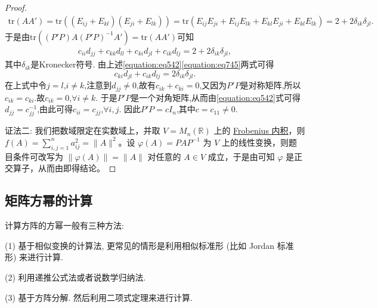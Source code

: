 \documentclass[../../main.tex]{subfiles}
\begin{document}
\begin{proof}
\begin{align*}
\mathrm{tr}\left( AA' \right) =\mathrm{tr}\left( \left( E_{ij}+E_{kl} \right) \left( E_{ji}+E_{lk} \right) \right) =\mathrm{tr}\left( E_{ij}E_{ji}+E_{ij}E_{lk}+E_{kl}E_{ji}+E_{kl}E_{lk} \right)=2 + 2\delta_{ik}\delta_{jl}.    
\end{align*}
于是由$\text{tr}((P'P)A(P'P)^{-1}A')=\text{tr}(AA')$可知
\begin{align}\label{equation:eq745}
c_{ii}d_{jj}+c_{kk}d_{ll}+c_{ki}d_{jl}+c_{ik}d_{lj}=2 + 2\delta_{ik}\delta_{jl},  
\end{align}
其中\(\delta_{ik}\)是Kronecker符号. 由上述\eqref{equation:eq542}\eqref{equation:eq745}两式可得
\[
c_{ki}d_{jl}+c_{ik}d_{lj}=2\delta_{ik}\delta_{jl}.
\]
在上式中令\(j = l\),\(i\neq k\),注意到\(d_{jj}\neq0\),故有\(c_{ik}+c_{ki}=0\),又因为\(P'P\)是对称矩阵,所以\(c_{ik}=c_{ki}\).故\(c_{ik}=0\),\(\forall i\neq k\). 于是\(P'P\)是一个对角矩阵,从而由\eqref{equation:eq542}式可得\(d_{jj}=c_{jj}^{-1}\),由此可得\(c_{ii}=c_{jj}\),\(\forall i,j\). 因此\(P'P = cI_n\),其中\(c = c_{11}\neq0\).

{\color{blue}证法二:}
我们把数域限定在实数域上，并取 \(V = M_n(\mathbb{R})\) 上的 \hyperlink{Frobenius 内积}{Frobenius 内积}，则 \(f(A)=\sum_{i,j = 1}^{n}a_{ij}^2=\|A\|^2\)。设 \(\varphi(A)=PAP^{-1}\) 为 \(V\) 上的线性变换，则题目条件可改写为 \(\|\varphi(A)\|=\|A\|\) 对任意的 \(A\in V\) 成立，于是由可知 \(\varphi\) 是正交算子，从而由即得结论。
\end{proof}


\subsection{矩阵方幂的计算}

计算方阵的方幂一般有三种方法:

(1) 基于相似变换的计算法, 更常见的情形是利用相似标准形 (比如 Jordan 标准形) 来进行计算.

(2) 利用递推公式法或者说数学归纳法.

(3) 基于方阵分解. 然后利用二项式定理来进行计算.
\end{document}
